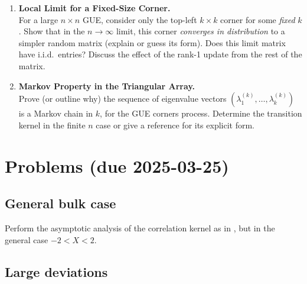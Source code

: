 \documentclass[letterpaper,11pt,oneside,reqno]{article}
\numberwithin{equation}{section}
\theoremstyle{definition}
\begin{document}
\begin{enumerate}
\item \textbf{Local Limit for a Fixed-Size Corner.} \\
For a large $n\times n$ GUE, consider only the top-left $k\times k$ corner for some \emph{fixed} $k$. Show that in the $n\to\infty$ limit, this corner \emph{converges in distribution} to a simpler random matrix (explain or guess its form). Does this limit matrix have i.i.d.\ entries? Discuss the effect of the rank-1 update from the rest of the matrix.
\medskip

\item \textbf{Markov Property in the Triangular Array.} \\
Prove (or outline why) the sequence of eigenvalue vectors $(\lambda_1^{(k)},\dots,\lambda_k^{(k)})$ is a Markov chain in $k$, for the GUE corners process. Determine the transition kernel in the finite $n$ case or give a reference for its explicit form.
\end{enumerate}





































\appendix
\setcounter{section}{6}

\section{Problems (due 2025-03-25)}

\subsection{General bulk case}
\label{prob:imaginary-critical-points}

Perform the asymptotic analysis of the correlation
kernel as in ,
but in the general case $-2<X<2$.


\subsection{Large deviations}
\label{prob:large-deviation}
\end{document}
